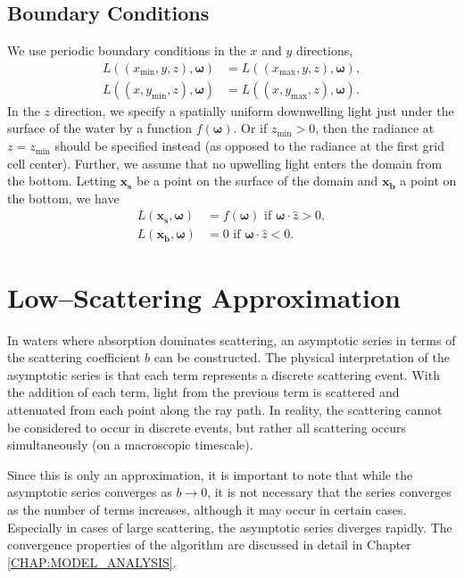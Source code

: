 \documentclass[ms,cpyr,lof,lot]{uathesis}
\newcommand\xmin{{x_{\min}}}
\newcommand\xmax{{x_{\max}}}
\newcommand\ymin{{y_{\min}}}
\newcommand\ymax{{y_{\max}}}
\newcommand\zmin{{z_{\min}}}
\renewcommand\vec\bm
\newcommand{\Rom}[1]{\uppercase\expandafter{\romannumeral#1\relax}}
\begin{document}
\subsection{Boundary Conditions}

We use periodic boundary conditions in the $x$ and $y$ directions,
\begin{align*}
  L\left((\xmin, y, z), \vec{\omega}\right) &= L\left((\xmax, y, z), \vec{\omega}\right), \\
  L\left((x, \ymin, z), \vec{\omega}\right) &= L\left((x, \ymax, z), \vec{\omega}\right).
\end{align*}
In the $z$ direction, we specify a spatially uniform downwelling light just
under the surface of the water by a function $f(\vec{\omega})$.
Or if $\zmin>0$, then the radiance at $z=\zmin$ should be specified instead (as opposed to the radiance at the first grid cell center).
Further, we assume that no upwelling light enters the domain from the bottom.
Letting $\vec{x_s}$ be a point on the surface of the domain and $\vec{x_b}$ a point on the bottom, we have
\begin{align*}
  L(\vec{x_s}, \vec{\omega}) &= f(\vec{\omega}) \mbox{ if } \vec{\omega} \cdot \hat{z} > 0, \\
  L(\vec{x_b}, \vec{\omega}) &= 0 \mbox { if } \vec{\omega} \cdot \hat{z} < 0.
\end{align*}

\section{Low--Scattering Approximation}
\label{sec:symbolic_asymptotics}
In waters where absorption dominates scattering, an asymptotic series in terms of the scattering coefficient $b$ can be constructed.
The physical interpretation of the asymptotic series is that each term represents a discrete scattering event.
With the addition of each term, light from the previous term is scattered and attenuated from each point along the ray path.
In reality, the scattering cannot be considered to occur in discrete events, but rather all scattering occurs simultaneously (on a macroscopic timescale).

Since this is only an approximation, it is important to note that while the asymptotic series converges as $b \to 0$, it is not necessary that the series converges as the number of terms increases, although it may occur in certain cases.
Especially in cases of large scattering, the asymptotic series diverges rapidly.
The convergence properties of the algorithm are discussed in detail in Chapter \Rom{\ref{chap:model_analysis}}.
\end{document}
